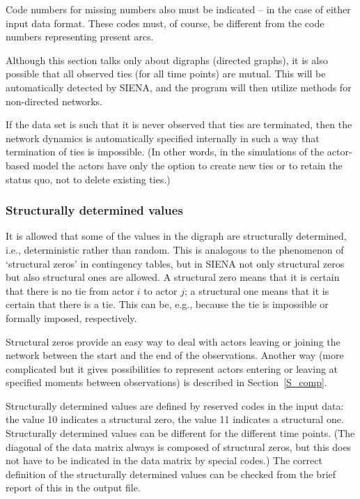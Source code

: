 \documentclass[a4paper,fleqn]{article}
\newcommand{\+}{\, + \,}
\newcommand{\SI}{{\sf SIENA }}
\newcommand{\si}{{\sf SIENA}}
\begin{document}
{Code numbers for missing numbers also must be indicated -- in the case of either
input data format. These
codes must, of course, be different from the code numbers
representing present arcs.

Although this section talks only about digraphs (directed graphs), it is
also possible that all observed ties (for all time points) are mutual.
This will be automatically detected by \si, and
the program will then utilize methods for non-directed networks.

If the data set is such that it is never observed that ties are terminated,
then the network dynamics is automatically specified internally in such a way
that termination of ties is impossible.
(In other words, in the simulations of the actor-based model
the actors have only the option to create new ties or to retain
the status quo, not to delete existing ties.)


\subsubsection{Structurally determined values}
\label{S_struct}

It is allowed that some of the values in the digraph are
structurally determined, i.e., deterministic rather than random.
This is analogous to the phenomenon of `structural zeros' in
contingency tables, but in \SI not only structural zeros but also
structural ones are allowed. A structural zero means that it is
certain that there is no tie from actor $i$ to actor $j$; a
structural one means that it is certain that there is a tie. This
can be, e.g., because the tie is impossible or formally imposed,
respectively.

Structural zeros provide an easy way to deal with actors leaving
or joining the network between the start and the end
of the observations. Another way
(more complicated but it gives possibilities to represent actors
entering or leaving at specified moments between observations)
is described in Section~\ref{S_comp}.

Structurally determined values are defined by reserved codes in
the input data: the value 10 indicates a structural zero, the
value 11 indicates a structural one. Structurally determined
values can be different for the different time points. (The
diagonal of the data matrix always is composed of structural
zeros, but this does not have to be indicated in the data matrix
by special codes.) The correct definition of the structurally
determined values can be checked from the brief report of this in
the output file.

}
\end{document}
